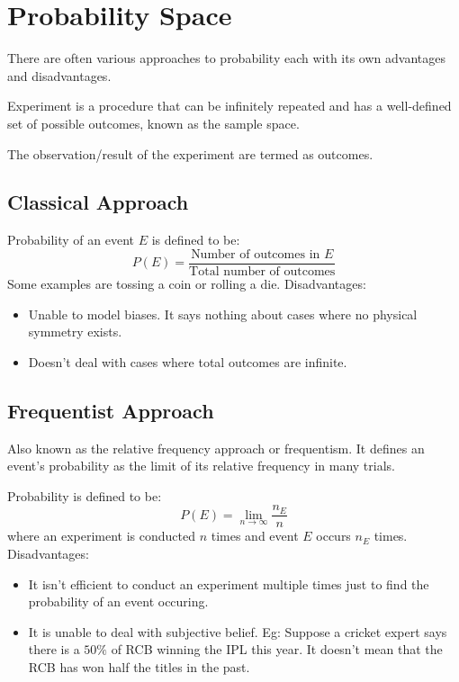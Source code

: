 \documentclass{article}
\begin{document}
\section{Probability Space}
There are often various approaches to probability each with its own advantages
and disadvantages.

Experiment is a procedure that can be infinitely repeated and has a
well-defined set of possible outcomes, known as the sample space.

The observation/result of the experiment are termed as outcomes.

\subsection{Classical Approach}
        Probability of an event $E$ is defined to be: $$P(E)=\frac{\text{Number of outcomes in }E}{\text{Total number of outcomes}}$$
         Some examples are tossing a coin or rolling a die.
         Disadvantages:
         \begin{itemize}
             \item Unable to model biases. It says nothing about cases where no
             physical symmetry exists.
             \item Doesn't deal with cases where total outcomes are infinite.
         \end{itemize}

         \subsection{Frequentist Approach}
         Also known as the relative frequency approach or frequentism. It defines
         an event's probability as the limit of its relative frequency in many
         trials.

         Probability is defined to be:
         $$ P(E)=\lim_{n \to \infty} \frac{n_E}{n}$$
         where an experiment is conducted $n$ times and event $E$ occurs $n_E$
         times.
         Disadvantages:
         \begin{itemize}
             \item It isn't efficient to conduct an experiment multiple times
             just to find the probability of an event occuring.
             \item It is unable to deal with subjective belief. Eg: Suppose a
             cricket expert says there is a $50\%$ of RCB winning the IPL this
             year. It doesn't mean that the RCB has won half the titles in the
             past.
         \end{itemize}
%
\end{document}
